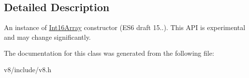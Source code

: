 \subsection{Detailed Description}
An instance of \hyperlink{classv8_1_1Int16Array}{Int16\-Array} constructor (E\-S6 draft 15..). This A\-P\-I is experimental and may change significantly. 

The documentation for this class was generated from the following file\-:\begin{DoxyCompactItemize}
\item 
v8/include/v8.\-h\end{DoxyCompactItemize}
